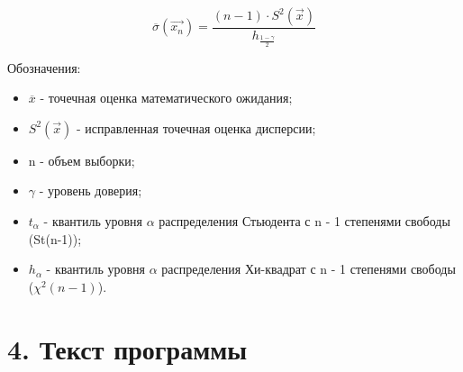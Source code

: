 \documentclass[12pt]{report}
\begin{document}
\begin{equation*}
	\overline{\sigma}(\vec{x_n}) = \frac{(n - 1) \cdot S^2(\vec{x})}{h_\frac{1-\gamma}{2}}
\end{equation*}

Обозначения:

\begin{itemize}
	\item $\overline{x}$ - точечная оценка математического ожидания;
	\item $S^2(\vec{x})$ - исправленная точечная оценка дисперсии;
	\item n - объем выборки;
	\item $\gamma$ - уровень доверия;
	\item $t_\alpha$ - квантиль уровня $\alpha$ распределения Стьюдента с n - 1 степенями свободы (St(n-1));
	\item $h_\alpha$ - квантиль уровня $\alpha$ распределения Хи-квадрат с n - 1 степенями свободы ($\chi^2(n-1)$).
\end{itemize}

\clearpage
\section*{4. Текст программы}
\end{document}
